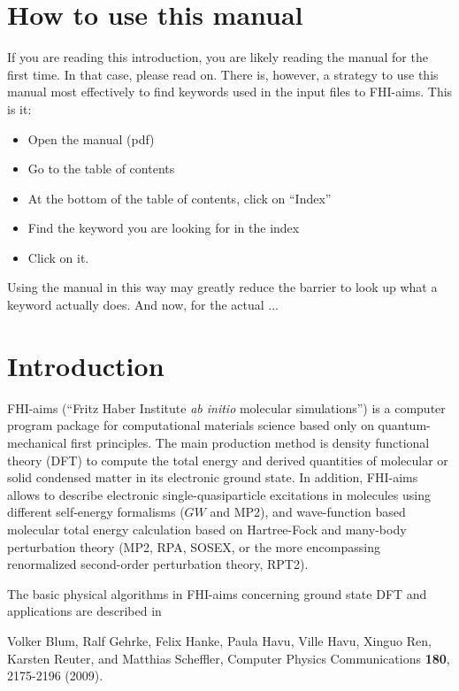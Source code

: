\chapter*{How to use this manual}

If you are reading this introduction, you are likely reading the
manual for the first time. In that case, please read on. There is,
however, a strategy to use this manual most effectively to find
keywords used in the input files to FHI-aims. This is it:
\begin{itemize}
  \item Open the manual (pdf)
  \item Go to the table of contents
  \item At the bottom of the table of contents, click on ``Index''
  \item Find the keyword you are looking for in the index
  \item Click on it.
\end{itemize}
Using the manual in this way may greatly reduce the barrier to look up
what a keyword actually does. And now, for the actual ...

\chapter*{Introduction}

FHI-aims (``Fritz Haber Institute \emph{ab initio} molecular simulations'') is
a computer program package for computational materials science based only on
quantum-mechanical first principles. The main production method is density
functional theory (DFT) \cite{Hohenberg64,Kohn65,Dreizler90} to compute the total energy and
derived quantities of molecular or solid condensed matter in its electronic
ground state. In addition, FHI-aims allows to describe electronic
single-quasiparticle excitations in molecules using different self-energy
formalisms ($GW$ and MP2), and wave-function based molecular total energy
calculation based on Hartree-Fock and many-body perturbation theory (MP2,
RPA, SOSEX, or the more encompassing renormalized second-order
perturbation theory, RPT2). 

The basic physical algorithms in FHI-aims concerning ground state DFT and
applications are described in

\begin{center}
\parbox[c]{0.8\textwidth}
{\small
Volker Blum, Ralf Gehrke, Felix Hanke, Paula Havu, Ville Havu, Xinguo Ren,
Karsten Reuter, and Matthias Scheffler, Computer Physics Communications
\textbf{180}, 2175-2196 (2009). 
}
\end{center}

